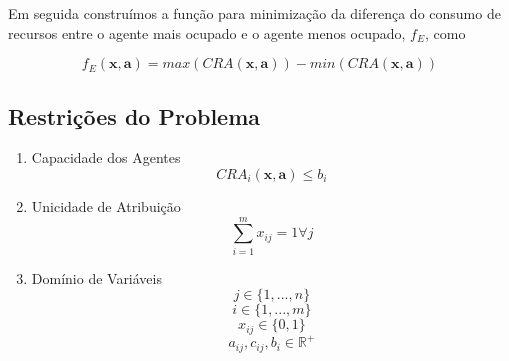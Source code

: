 Em seguida construímos a função para minimização da diferença do consumo de
recursos entre o agente mais ocupado e o agente menos ocupado, $f_E$, como

$$ f_E(\mathbf{x}, \mathbf{a}) = max(CRA(\mathbf{x}, \mathbf{a})) - min(CRA(\mathbf{x}, \mathbf{a}))$$

\subsection{Restrições do Problema}

\begin{enumerate}[label=(\roman*)]
    \item Capacidade dos Agentes
        $$ CRA_{i} (\mathbf{x}, \mathbf{a}) \leq b_i $$
    \item Unicidade de Atribuição
        $$\sum^{m}_{i=1} x_{ij} = 1 \forall j$$
    \item Domínio de Variáveis
        $$j \in \{1, ..., n\}$$
        $$i \in \{1, ..., m\}$$
        $$x_{ij} \in \{0, 1\}$$
        $$a_{ij}, c_{ij}, b_i \in \mathbb{R}^{+}$$
\end{enumerate}


